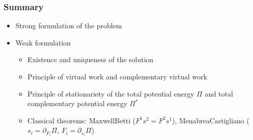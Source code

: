 \documentclass[letterpaper,10pt,english]{jupyterBook}
\begin{document}
\subsubsection*{Summary}
\begin{itemize}
\item {} 
\sphinxAtStartPar
Strong formulation of the problem

\item {} 
\sphinxAtStartPar
Weak formulation
\begin{itemize}
\item {} 
\sphinxAtStartPar
Existence and uniqueness of the solution

\item {} 
\sphinxAtStartPar
Principle of virtual work and complementary virtual work

\item {} 
\sphinxAtStartPar
Principle of stationariety of the total potential energy \(\Pi\) and total complementary potential energy \(\Pi^*\)

\item {} 
\sphinxAtStartPar
Classical theorems: Maxwell\sphinxhyphen{}Betti (\(F^1 s^2 = F^2 s^1\)), Menabrea\sphinxhyphen{}Castigliano (\(s_i = \partial_{F_i} \Pi\), \(F_i = \partial_{s_i} \Pi\))

\end{itemize}

\end{itemize}
\end{document}
